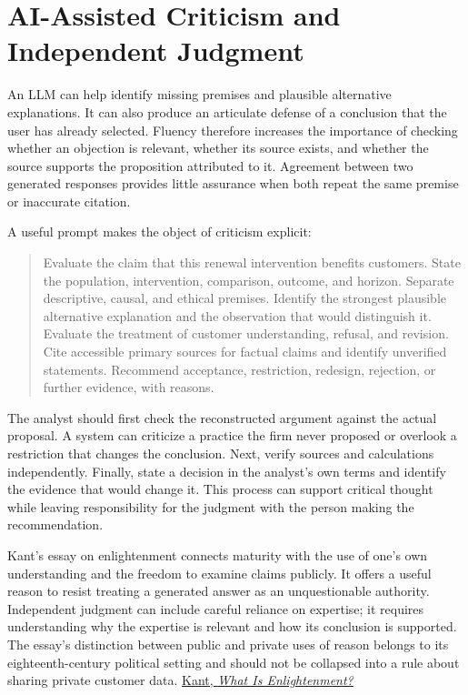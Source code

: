 
\hypertarget{M09-ai-assisted-criticism-and-independent-judgment}{%
\section{AI-Assisted Criticism and Independent
Judgment}\label{M09-ai-assisted-criticism-and-independent-judgment}}

\noindent \noindent An LLM can help identify missing premises and plausible
alternative explanations. It can also produce an articulate defense of a
conclusion that the user has already selected. Fluency therefore
increases the importance of checking whether an objection is relevant,
whether its source exists, and whether the source supports the
proposition attributed to it. Agreement between two generated responses
provides little assurance when both repeat the same premise or
inaccurate citation.

A useful prompt makes the object of criticism explicit:

\begin{quote}
Evaluate the claim that this renewal intervention benefits customers.
State the population, intervention, comparison, outcome, and horizon.
Separate descriptive, causal, and ethical premises. Identify the
strongest plausible alternative explanation and the observation that
would distinguish it. Evaluate the treatment of customer understanding,
refusal, and revision. Cite accessible primary sources for factual
claims and identify unverified statements. Recommend acceptance,
restriction, redesign, rejection, or further evidence, with reasons.
\end{quote}

The analyst should first check the reconstructed argument against the
actual proposal. A system can criticize a practice the firm never
proposed or overlook a restriction that changes the conclusion. Next,
verify sources and calculations independently. Finally, state a decision
in the analyst's own terms and identify the evidence that would change
it. This process can support critical thought while leaving
responsibility for the judgment with the person making the
recommendation.

Kant's essay on enlightenment connects maturity with the use of one's
own understanding and the freedom to examine claims publicly. It offers
a useful reason to resist treating a generated answer as an
unquestionable authority. Independent judgment can include careful
reliance on expertise; it requires understanding why the expertise is
relevant and how its conclusion is supported. The essay's distinction
between public and private uses of reason belongs to its
eighteenth-century political setting and should not be collapsed into a
rule about sharing private customer data.
\href{https://users.manchester.edu/facstaff/ssnaragon/online/texts/318/kant\%2C\%20enlightenment.pdf}{Kant,
\emph{What Is Enlightenment?}}

